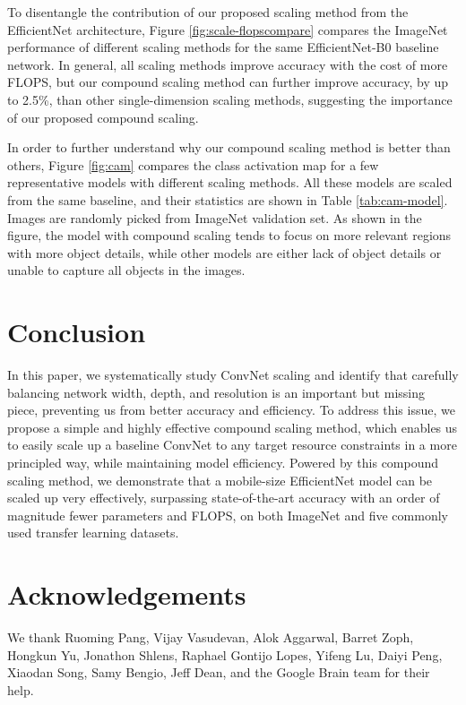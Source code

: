 \documentclass{article}
\begin{document}
To disentangle the contribution of our proposed scaling method from the EfficientNet architecture, Figure \ref{fig:scale-flopscompare} compares the ImageNet performance of different scaling methods for the same EfficientNet-B0 baseline network.  In general, all scaling methods improve accuracy with the cost of more FLOPS, but our compound scaling method can further improve accuracy, by up to 2.5\%, than other single-dimension scaling methods, suggesting the importance of our proposed compound scaling.



In order to further understand why our compound scaling method is better than others, Figure \ref{fig:cam} compares the class activation map \cite{cam16} for a few representative models with different scaling methods. All these models are scaled from the same baseline, and their statistics are shown in Table \ref{tab:cam-model}. Images are randomly picked from ImageNet validation set.  As shown in the figure, the model with compound scaling tends to focus on more relevant regions with more object details, while other models are either lack of object details or unable to capture all objects in the images.
\section{Conclusion}
\label{sec:conclusion}

In this paper, we systematically study ConvNet scaling and identify that carefully balancing network width, depth, and resolution is an important but missing piece, preventing us from better accuracy and efficiency. To address this issue, we propose a simple and highly effective compound scaling method, which enables us to easily scale up a baseline ConvNet to any target resource constraints in a more principled way, while maintaining model efficiency.  Powered by this compound scaling method, we demonstrate that a mobile-size EfficientNet model can be scaled up very effectively, surpassing state-of-the-art accuracy with an order of magnitude fewer parameters and FLOPS, on both ImageNet and five commonly used  transfer learning datasets.

\section*{Acknowledgements}
We thank Ruoming Pang, Vijay Vasudevan, Alok Aggarwal, Barret Zoph, Hongkun Yu, Jonathon Shlens, Raphael Gontijo Lopes, 
Yifeng Lu, Daiyi Peng, Xiaodan Song, Samy Bengio, Jeff Dean, and the Google Brain team for their help.
\end{document}
